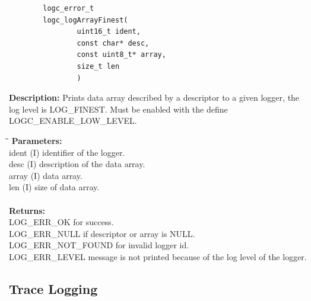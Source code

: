 \documentclass[a4paper, titlepage, 11pt]{article}
\begin{document}
\small
\begin{verbatim}
        logc_error_t
        logc_logArrayFinest(
                uint16_t ident,
                const char* desc,
                const uint8_t* array,
                size_t len
                )
\end{verbatim}
\normalsize
\textbf{Description:} Prints data array described by a descriptor to a given logger, the log level is LOG\_FINEST. Must be enabled with the define LOGC\_ENABLE\_LOW\_LEVEL.
\begin{tabbing}
\hspace*{1cm}\=\hspace*{2cm}\=\hspace*{0,6cm}\= \kill
\textbf{Parameters:} \\
\> ident \> (I) identifier of the logger. \\
\> desc \> (I) description of the data array. \\
\> array \> (I) data array. \\
\> len \> (I) size of data array. \\ \\
\textbf{Returns:} \\
\> LOG\_ERR\_OK for success. \\
\> LOG\_ERR\_NULL if descriptor or array is NULL. \\
\> LOG\_ERR\_NOT\_FOUND for invalid logger id. \\
\> LOG\_ERR\_LEVEL message is not printed because of the log level of the logger.
\end{tabbing}

\newpage

\subsection{Trace Logging}
\end{document}
